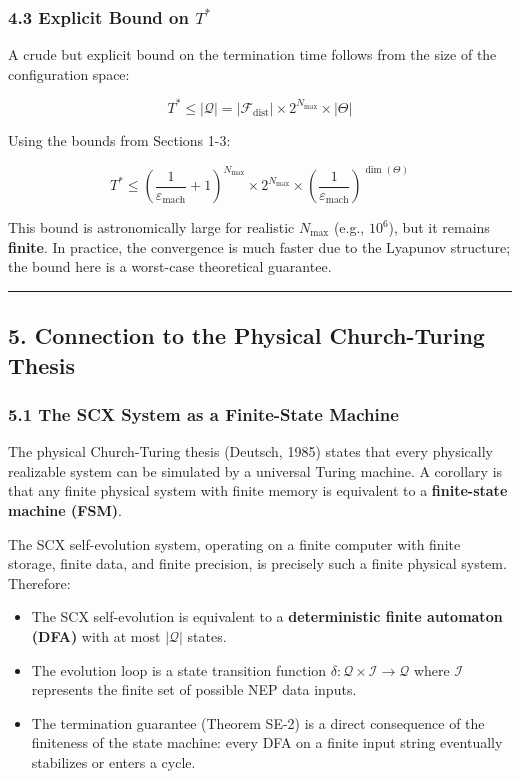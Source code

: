 \documentclass[
  12pt,
]{article}
\providecommand{\tightlist}{%
  \setlength{\itemsep}{0pt}\setlength{\parskip}{0pt}}
\begin{document}
\subsubsection{\texorpdfstring{4.3 Explicit Bound on
\(T^*\)}{4.3 Explicit Bound on T\^{}*}}\label{explicit-bound-on-t}

A crude but explicit bound on the termination time follows from the size
of the configuration space:

\[T^* \leq |\mathcal{Q}| = |\mathcal{F}_{\text{dist}}| \times 2^{N_{\text{max}}} \times |\Theta|\]

Using the bounds from Sections 1-3:

\[T^* \leq \left( \frac{1}{\varepsilon_{\text{mach}}} + 1 \right)^{N_{\text{max}}} \times 2^{N_{\text{max}}} \times \left( \frac{1}{\varepsilon_{\text{mach}}} \right)^{\dim(\Theta)}\]

This bound is astronomically large for realistic \(N_{\text{max}}\)
(e.g., \(10^6\)), but it remains \textbf{finite}. In practice, the
convergence is much faster due to the Lyapunov structure; the bound here
is a worst-case theoretical guarantee.

\begin{center}\rule{0.5\linewidth}{0.5pt}\end{center}

\subsection{5. Connection to the Physical Church-Turing
Thesis}\label{connection-to-the-physical-church-turing-thesis}

\subsubsection{5.1 The SCX System as a Finite-State
Machine}\label{the-scx-system-as-a-finite-state-machine}

The physical Church-Turing thesis (Deutsch, 1985) states that every
physically realizable system can be simulated by a universal Turing
machine. A corollary is that any finite physical system with finite
memory is equivalent to a \textbf{finite-state machine (FSM)}.

The SCX self-evolution system, operating on a finite computer with
finite storage, finite data, and finite precision, is precisely such a
finite physical system. Therefore:

\begin{itemize}
\tightlist
\item
  The SCX self-evolution is equivalent to a \textbf{deterministic finite
  automaton (DFA)} with at most \(|\mathcal{Q}|\) states.
\item
  The evolution loop is a state transition function
  \(\delta: \mathcal{Q} \times \mathcal{I} \to \mathcal{Q}\) where
  \(\mathcal{I}\) represents the finite set of possible NEP data inputs.
\item
  The termination guarantee (Theorem SE-2) is a direct consequence of
  the finiteness of the state machine: every DFA on a finite input
  string eventually stabilizes or enters a cycle.
\end{itemize}
\end{document}
